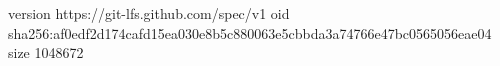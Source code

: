version https://git-lfs.github.com/spec/v1
oid sha256:af0edf2d174cafd15ea030e8b5c880063e5cbbda3a74766e47bc0565056eae04
size 1048672
